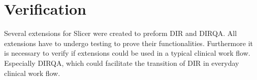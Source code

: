 \documentclass[type=dr, dr=rernat, accentcolor=tud7b,colorbacktitle, bigchapter, openright, twoside, 12pt ]{tudthesis}
\begin{document}
% 
% 
% 
% 
% 


\newpage
\section{Verification}
\label{Verification}

Several extensions for Slicer were created to preform DIR and DIRQA. All extensions have to undergo testing to prove their functionalities. Furthermore it is necessary to verify if extensions could be used in a typical clinical work flow.
Especially DIRQA, which could facilitate the transition of DIR in everyday clinical work flow.
\end{document}
